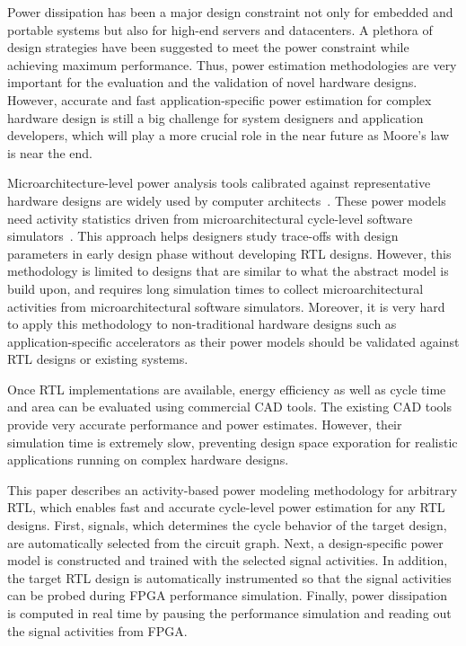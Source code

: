 Power dissipation has been a major design constraint not only for embedded and portable systems
but also for high-end servers and datacenters. A plethora of design strategies have been suggested
to meet the power constraint while achieving maximum performance. Thus, power estimation 
methodologies are very important for the evaluation and the validation of novel hardware designs.
However, accurate and fast application-specific power estimation for complex hardware design
is still a big challenge for system designers and application developers, which will play
a more crucial role in the near future as Moore's law is near the end.

Microarchitecture-level power analysis tools calibrated against representative hardware designs
are widely used by computer architects~\cite{Brooks2000, Vijaykrishnan2000, Li2009, Leng2013, Shao2014}.
These power models need activity statistics driven from microarchitectural cycle-level software
simulators~\cite{Binkert2011, Patel2011, Wenisch2006}. 
This approach helps designers study trace-offs with design parameters in early design phase
without developing RTL designs. However, this methodology is limited to designs that are similar 
to what the abstract model is build upon, and requires long simulation times to collect 
microarchitectural activities from microarchitectural software simulators. 
Moreover, it is very hard to apply this methodology to non-traditional hardware designs
such as application-specific accelerators as their power models should be validated against
RTL designs or existing systems.

Once RTL implementations are available, energy efficiency as well as cycle time and area
can be evaluated using commercial CAD tools. The existing CAD tools provide very accurate
performance and power estimates. However, their simulation time is extremely slow, preventing
design space exporation for realistic applications running on complex hardware designs.

This paper describes an activity-based power modeling methodology for arbitrary RTL,
which enables fast and accurate cycle-level power estimation for any RTL designs.
First, signals, which determines the cycle behavior of the target design, are automatically
selected from the circuit graph. Next, a design-specific power model is constructed and
trained with the selected signal activities. In addition, the target RTL design is automatically
instrumented so that the signal activities can be probed during FPGA performance simulation.
Finally, power dissipation is computed in real time by pausing the performance simulation and
reading out the signal activities from FPGA.